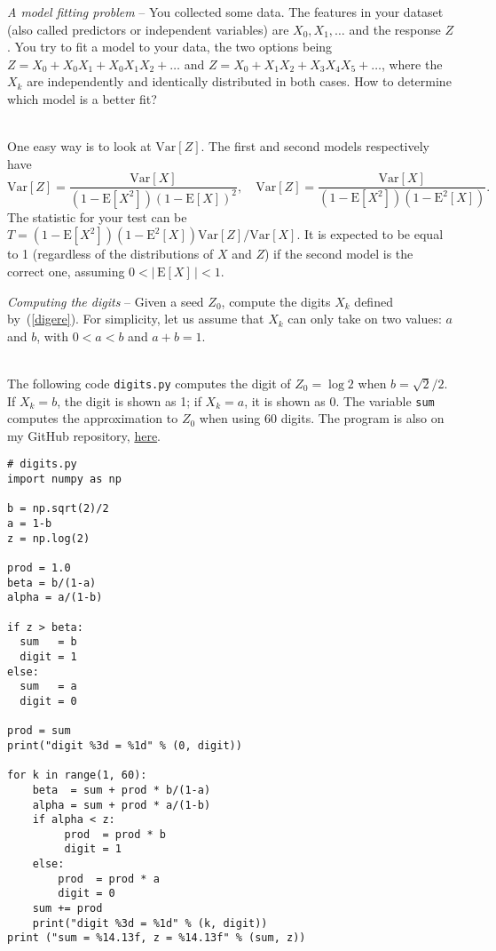 \documentclass[oneside,10pt]{book}
\begin{document}
\begin{Exercise}\label{p} {\em A model fitting problem} --  You collected some data. The
 features in your dataset (also called predictors or independent variables) are $X_0, X_1,\dots$ and the
 response $Z$. You try to fit a model to your data, the two options being
$Z = X_0 + X_0X_1+X_0X_1 X_2+\dots$ and $Z = X_0 + X_1X_2+X_3X_4 X_5+\dots$, where the $X_k$ are independently and identically
 distributed in both cases. How to determine which model is a better fit?
\vspace{1ex}

 \\
One easy way is to look at $\text{Var}[Z]$. The first and second models respectively have
$$
 \text{Var}[Z] = \frac{\text{Var}[X]}{(1-\text{E}[X^2])(1-\text{E}[X])^2},
\quad \text{Var}[Z]=\frac{\text{Var}[X]}{(1 - \text{E}[X^2]) (1 - \text{E}^2[X])}.
$$
The statistic for your test can be $T =  (1 - \text{E}[X^2]) (1 - \text{E}^2[X]) \text{Var}[Z]/ \text{Var}[X]$. It is expected
 to be equal to 1 (regardless of the distributions of $X$ and $Z$) if the second model is the correct one, assuming $0 < |\, \text{E}[X] \,| < 1$.
\end{Exercise}


\begin{Exercise}\label{polcjon} {\em Computing the digits} -- Given a seed $Z_0$, compute
  the digits $X_k$ defined by~(\ref{digere}). For simplicity, let us assume that $X_k$ can only take on two values: $a$ and $b$,
with $0<a<b$ and $a+b=1$.  \vspace{1ex}

 \\
The following code \texttt{digits.py} computes the digit of $Z_0 = \log 2$ when $b = \sqrt{2}/2$.
If $X_k=b$, the digit is shown as 1; if $X_k=a$, it is shown as 0. The variable \texttt{sum} computes the approximation
 to $Z_0$ when using 60 digits. The program is also on my GitHub repository,
 \href{https://github.com/VincentGranville/Stochastic-Processes/blob/master/digits.py}{here}.\vspace{1ex}
\begin{lstlisting}
# digits.py
import numpy as np

b = np.sqrt(2)/2
a = 1-b
z = np.log(2)

prod = 1.0
beta = b/(1-a)
alpha = a/(1-b)

if z > beta:
  sum   = b
  digit = 1
else:
  sum   = a
  digit = 0

prod = sum
print("digit %3d = %1d" % (0, digit))

for k in range(1, 60):
    beta  = sum + prod * b/(1-a)
    alpha = sum + prod * a/(1-b)
    if alpha < z:
         prod  = prod * b
         digit = 1
    else:
        prod  = prod * a
        digit = 0
    sum += prod
    print("digit %3d = %1d" % (k, digit))
print ("sum = %14.13f, z = %14.13f" % (sum, z))
\end{lstlisting}
\end{Exercise}
\end{document}
